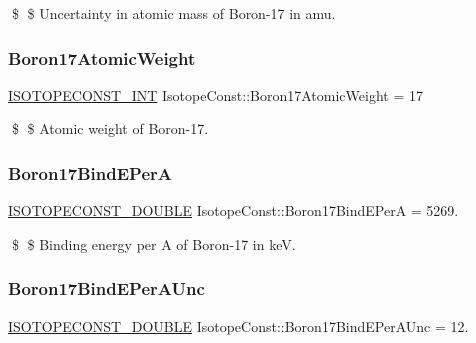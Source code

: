 \$ \$ Uncertainty in atomic mass of Boron-\/17 in amu. \mbox{\label{group___isotope_const-_boron-_b17_ga4fb061f6f5e0c1a4ae1fb638826c568f}} 
\subsubsection{\texorpdfstring{Boron17\+Atomic\+Weight}{Boron17AtomicWeight}}
{\footnotesize\ttfamily \mbox{\hyperlink{group___isotope_const-_macros_ga5f18360b3e99483a35c32d789e62621c}{I\+S\+O\+T\+O\+P\+E\+C\+O\+N\+S\+T\+\_\+\+I\+NT}} Isotope\+Const\+::\+Boron17\+Atomic\+Weight = 17}

\$ \$ Atomic weight of Boron-\/17. \mbox{\label{group___isotope_const-_boron-_b17_ga45e3d7b0891332b5059de96e7e0865ae}} 
\subsubsection{\texorpdfstring{Boron17\+Bind\+E\+PerA}{Boron17BindEPerA}}
{\footnotesize\ttfamily \mbox{\hyperlink{group___isotope_const-_macros_ga8f45a7272ce02c0b4c65c44636ed719a}{I\+S\+O\+T\+O\+P\+E\+C\+O\+N\+S\+T\+\_\+\+D\+O\+U\+B\+LE}} Isotope\+Const\+::\+Boron17\+Bind\+E\+PerA = 5269.}

\$ \$ Binding energy per A of Boron-\/17 in keV. \mbox{\label{group___isotope_const-_boron-_b17_ga9b03bdbba6d4a176b6eba12bbfc6d189}} 
\subsubsection{\texorpdfstring{Boron17\+Bind\+E\+Per\+A\+Unc}{Boron17BindEPerAUnc}}
{\footnotesize\ttfamily \mbox{\hyperlink{group___isotope_const-_macros_ga8f45a7272ce02c0b4c65c44636ed719a}{I\+S\+O\+T\+O\+P\+E\+C\+O\+N\+S\+T\+\_\+\+D\+O\+U\+B\+LE}} Isotope\+Const\+::\+Boron17\+Bind\+E\+Per\+A\+Unc = 12.}

